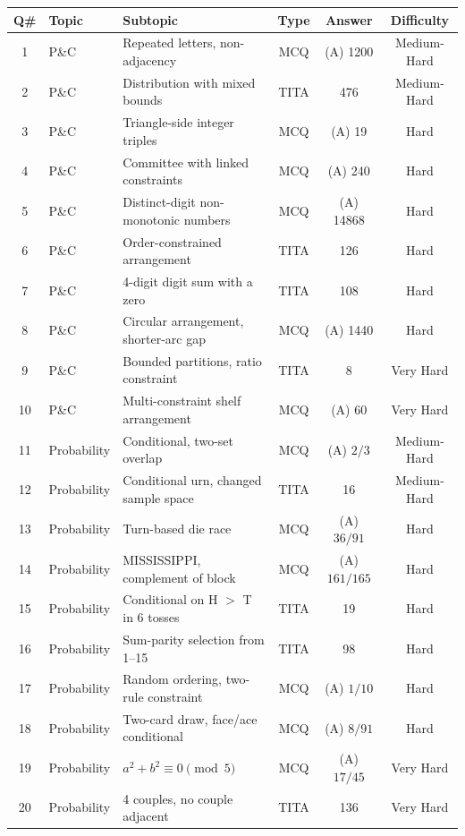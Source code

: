 \documentclass[11pt,a4paper]{article}
\begin{document}
\begin{center}
\renewcommand{\arraystretch}{1.18}
\begin{longtable}{|c|l|l|c|c|c|}
\hline
\textbf{Q\#} & \textbf{Topic} & \textbf{Subtopic} & \textbf{Type} & \textbf{Answer} & \textbf{Difficulty} \\
\hline
1  & P\&C        & Repeated letters, non-adjacency        & MCQ  & (A) 1200        & Medium-Hard \\
2  & P\&C        & Distribution with mixed bounds          & TITA & 476             & Medium-Hard \\
3  & P\&C        & Triangle-side integer triples           & MCQ  & (A) 19          & Hard \\
4  & P\&C        & Committee with linked constraints       & MCQ  & (A) 240         & Hard \\
5  & P\&C        & Distinct-digit non-monotonic numbers    & MCQ  & (A) 14868       & Hard \\
6  & P\&C        & Order-constrained arrangement           & TITA & 126             & Hard \\
7  & P\&C        & 4-digit digit sum with a zero           & TITA & 108             & Hard \\
8  & P\&C        & Circular arrangement, shorter-arc gap   & MCQ  & (A) 1440        & Hard \\
9  & P\&C        & Bounded partitions, ratio constraint    & TITA & 8               & Very Hard \\
10 & P\&C        & Multi-constraint shelf arrangement      & MCQ  & (A) 60          & Very Hard \\
11 & Probability & Conditional, two-set overlap            & MCQ  & (A) \(2/3\)     & Medium-Hard \\
12 & Probability & Conditional urn, changed sample space   & TITA & 16              & Medium-Hard \\
13 & Probability & Turn-based die race                     & MCQ  & (A) \(36/91\)   & Hard \\
14 & Probability & MISSISSIPPI, complement of block        & MCQ  & (A) \(161/165\) & Hard \\
15 & Probability & Conditional on H \(>\) T in 6 tosses    & TITA & 19              & Hard \\
16 & Probability & Sum-parity selection from 1--15         & TITA & 98              & Hard \\
17 & Probability & Random ordering, two-rule constraint    & MCQ  & (A) \(1/10\)    & Hard \\
18 & Probability & Two-card draw, face/ace conditional     & MCQ  & (A) \(8/91\)    & Hard \\
19 & Probability & \(a^2 + b^2 \equiv 0 \pmod 5\)          & MCQ  & (A) \(17/45\)   & Very Hard \\
20 & Probability & 4 couples, no couple adjacent           & TITA & 136             & Very Hard \\
\hline
\end{longtable}
\end{center}
\end{document}
